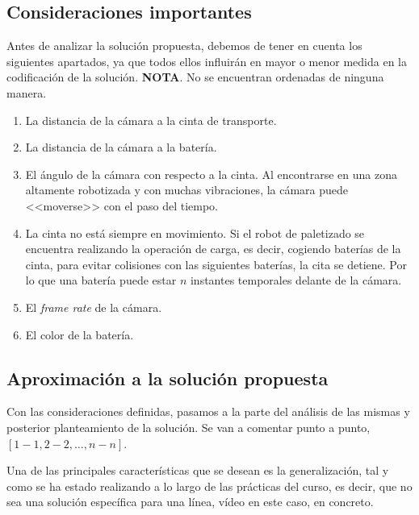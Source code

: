 \documentclass[11pt]{memoir}
\begin{document}
\subsection{Consideraciones importantes}
Antes de analizar la solución propuesta, debemos de tener en cuenta los siguientes apartados, ya que todos ellos influirán en mayor o menor medida en la codificación de la solución. \textbf{NOTA}. No se encuentran ordenadas de ninguna manera.
\begin{enumerate}
\item La distancia de la cámara a la cinta de transporte.
\item La distancia de la cámara a la batería.
\item El ángulo de la cámara con respecto a la cinta. Al encontrarse en una zona altamente robotizada y con muchas vibraciones, la cámara puede <<moverse>> con el paso del tiempo.
\item La cinta no está siempre en movimiento. Si el robot de paletizado se encuentra realizando la operación de carga, es decir, cogiendo baterías de la cinta, para evitar colisiones con las siguientes baterías, la cita se detiene. Por lo que una batería puede estar $n$ instantes temporales delante de la cámara.
\item El \textit{frame rate} de la cámara. 
\item El color de la batería.
\end{enumerate}

\subsection{Aproximación a la solución propuesta}
Con las consideraciones definidas, pasamos a la parte del análisis de las mismas y posterior planteamiento de la solución. Se van a comentar punto a punto, $[1-1, 2-2, \dots , n-n]$.

Una de las principales características que se desean es la generalización, tal y como se ha estado realizando a lo largo de las prácticas del curso, es decir, que no sea una solución específica para una línea, vídeo en este caso, en concreto.
\end{document}
